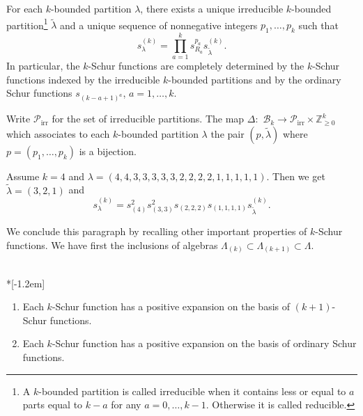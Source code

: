 \documentclass[ALCO,ThmDefs,Unicode,epreuves]{cedram}
\DeclareMathOperator{\irr}{irr}
\begin{document}
\begin{coro}\label{reducedCase} 
For each $k$-bounded partition $\lambda$, there exists a
unique irreducible $k$-bounded partition\footnote{A $k$-bounded partition is
called irreducible when it contains less or equal to $a$ parts equal to $k-a$ for any
$a=0,\ldots,k-1$. Otherwise it is called reducible.} $\widetilde{\lambda}$ and a unique sequence of nonnegative
integers $p_{1},\ldots,p_{k}$ such that
\[
s_{\lambda}^{(k)}=\prod_{a=1}^{k}s_{R_{a}}^{p_{a}}s_{\widetilde{\lambda}%
}^{(k)}.
\]
In particular, the $k$-Schur functions are completely determined by the
$k$-Schur functions indexed by the irreducible $k$-bounded partitions and by
the ordinary Schur functions $s_{(k-a+1)^{a}}$, $a=1,\ldots,k$.
\end{coro}

\begin{rema}
\label{Rem_bij}Write $\mathcal{P}_{\irr }$ for the set of irreducible
partitions. The map $\Delta:$ $\mathcal{B}_{k}\rightarrow\mathcal{P}%
_{\irr }\times\mathbb{Z}_{\geq0}^{k}$ which associates to each
$k$-bounded partition $\lambda$ the pair $(p,\widetilde{\lambda})$ where
$p=(p_{1},\ldots,p_{k})$ is a bijection.
\end{rema}

\begin{exam}
Assume $k=4$ and $\lambda=(4,4,3,3,3,3,3,2,2,2,2,1,1,1,1,1)$. Then we get
$\widetilde{\lambda}=(3,2,1)$ and
\[
s_{\lambda}^{(k)}=s_{(4)}^{2}s_{(3,3)}^{2}s_{(2,2,2)}s_{(1,1,1,1)}%
s_{\widetilde{\lambda}}^{(k)}.
\]

\end{exam}

We conclude this paragraph by recalling other important properties of
$k$-Schur functions. We have first the inclusions of algebras $\Lambda
_{(k)}\subset\Lambda_{(k+1)}\subset\Lambda$.

\begin{prop}
 \label{Prop_positiveExp}\ \\*[-1.2em] 

\begin{enumerate}
\item Each $k$-Schur function has a positive expansion on the basis of
$(k+1)$-Schur functions.

\item Each $k$-Schur function has a positive expansion on the basis of
ordinary Schur functions.
\end{enumerate}
\end{prop}
\end{document}
